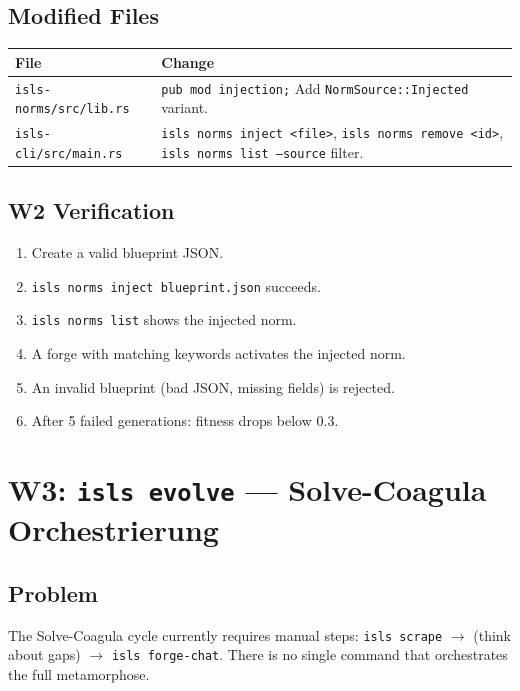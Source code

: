 \documentclass[11pt,a4paper]{article}
\begin{document}
\subsection{Modified Files}

\begin{longtable}{lp{10cm}}
\toprule
\textbf{File} & \textbf{Change} \\
\midrule
\texttt{isls-norms/src/lib.rs}
  & \texttt{pub mod injection;} Add 
    \texttt{NormSource::Injected} variant. \\
\texttt{isls-cli/src/main.rs}
  & \texttt{isls norms inject <file>}, 
    \texttt{isls norms remove <id>}, 
    \texttt{isls norms list --source} filter. \\
\bottomrule
\end{longtable}

\subsection{W2 Verification}

\begin{enumerate}[nosep]
\item Create a valid blueprint JSON.
\item \texttt{isls norms inject blueprint.json} succeeds.
\item \texttt{isls norms list} shows the injected norm.
\item A forge with matching keywords activates the injected norm.
\item An invalid blueprint (bad JSON, missing fields) is rejected.
\item After 5 failed generations: fitness drops below 0.3.
\end{enumerate}


\section{W3: \texttt{isls evolve} --- Solve-Coagula Orchestrierung}
\label{sec:w3}

\subsection{Problem}

The Solve-Coagula cycle currently requires manual steps:
\texttt{isls scrape} $\to$ (think about gaps) $\to$ 
\texttt{isls forge-chat}. There is no single command 
that orchestrates the full metamorphose.
\end{document}
